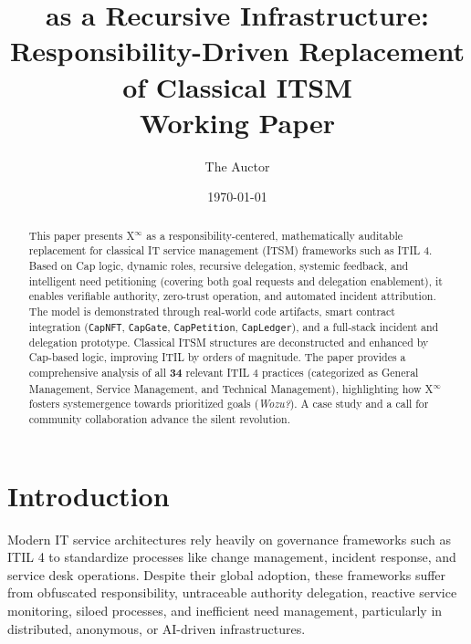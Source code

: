 \documentclass[12pt, a4paper]{scrartcl}
\title{\Xinf{} as a Recursive Infrastructure: Responsibility-Driven Replacement of Classical ITSM\\Working Paper}
\author{The Auctor}
\date{\today} %
\newcommand{\Xinf}{X$^\infty$}                        %
\newcommand{\CapLedger}{\texttt{CapLedger}}          %
\newcommand{\CapNFT}{\texttt{CapNFT}}
\newcommand{\CapGate}{\texttt{CapGate}}
\newcommand{\CapPetition}{\texttt{CapPetition}}        %
\newcommand{\Wozu}{\textit{Wozu?}}                      %
\begin{document}
\setlength{\parindent}{0pt}

\maketitle

\begin{abstract}
\noindent %
This paper presents \Xinf{} as a responsibility-centered, mathematically auditable replacement for classical IT service management (ITSM) frameworks such as ITIL 4. Based on Cap logic, dynamic roles, recursive delegation, systemic feedback, and intelligent need petitioning (covering both goal requests and delegation enablement), it enables verifiable authority, zero-trust operation, and automated incident attribution. The model is demonstrated through real-world code artifacts, smart contract integration (\CapNFT{}, \CapGate{}, \CapPetition{}, \CapLedger{}), and a full-stack incident and delegation prototype. Classical ITSM structures are deconstructed and enhanced by Cap-based logic, improving ITIL by orders of magnitude. The paper provides a comprehensive analysis of all \textbf{34} relevant ITIL 4 practices (categorized as General Management, Service Management, and Technical Management), highlighting how \Xinf{} fosters systemergence towards prioritized goals (\Wozu{}). A case study and a call for community collaboration advance the silent revolution.
\end{abstract}
\newpage
\tableofcontents
\newpage


\section{Introduction}

Modern IT service architectures rely heavily on governance frameworks such as ITIL 4  to standardize processes like change management, incident response, and service desk operations. Despite their global adoption, these frameworks suffer from obfuscated responsibility, untraceable authority delegation, reactive service monitoring, siloed processes, and inefficient need management, particularly in distributed, anonymous, or AI-driven infrastructures.
\end{document}
